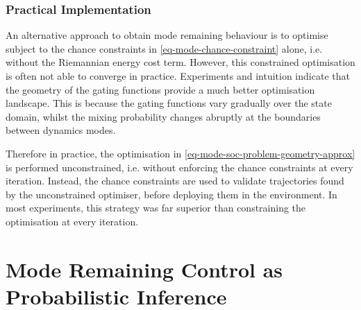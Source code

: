 \documentclass{mimosis-class/mimosis}
\numberwithin{equation}{chapter}
\newcommand{\modeInd}{\ensuremath{k}}
\newcommand{\state}{\ensuremath{\mathbf{x}}}
\newcommand{\control}{\ensuremath{\mathbf{u}}}
\newcommand{\modeVar}{\ensuremath{\alpha}}
\begin{document}
{\subsubsection{Practical Implementation}
\label{sec:org62d33fa}
An alternative approach to obtain mode remaining behaviour is to optimise subject to the chance constraints
in \cref{eq-mode-chance-constraint} alone, i.e. without the Riemannian energy cost term.
However, this constrained optimisation is often not able to converge in practice.
Experiments and intuition indicate that the geometry of the gating functions provide a much
better optimisation landscape.
This is because the gating functions vary gradually over the state domain, whilst the mixing probability changes
abruptly at the boundaries between dynamics modes.

Therefore in practice, the optimisation in \cref{eq-mode-soc-problem-geometry-approx}
is performed unconstrained, i.e. without enforcing the chance constraints at every iteration.
Instead, the chance constraints are used to validate trajectories found by the unconstrained
optimiser, before deploying them in the environment.
In most experiments, this strategy was far superior than constraining the optimisation at every iteration.

\section{Mode Remaining Control as Probabilistic Inference \label{chap-traj-opt-inference}}
\label{sec:orgd81abc5}
\newcommand{\startStateDist}{\ensuremath{p(\state_{1})}}
\newcommand{\transitionDist}{\ensuremath{p(\state_{\timeInd+1} \mid \state_\timeInd, \control_\timeInd, \modeVar_{\timeInd}=\desiredMode)}}
\renewcommand{\controlDist}{\ensuremath{\policy(\control_\timeInd \mid \state_\timeInd)}}


\renewcommand{\trajectoryVarDist}{\ensuremath{q(\stateTraj, \controlTraj \mid \state_0, \modeVarTraj)}}
\newcommand{\controlTrajVarDist}{\ensuremath{q(\control_{0:\TimeInd} \mid \state_{0:\TimeInd})}}
\newcommand{\controlVarDist}{\ensuremath{q(\control_{\timeInd})}}

\newcommand{\optimalVar}{\ensuremath{\mathcal{O}}}
\newcommand{\monotonicFunc}{\ensuremath{g}}
\newcommand{\temperature}{\ensuremath{\gamma}}

\newcommand{\optimalVarTraj}{\ensuremath{\bar{\bm{\optimalVar}}}}

\newcommand{\modeProb}{\ensuremath{\Pr(\modeVar_\timeInd = \modeInd \mid \state_\timeInd, \control_\timeInd)}}
\renewcommand{\optimalProb}{\ensuremath{\Pr(\optimalVar_\timeInd = 1 \mid \state_\timeInd, \control_\timeInd)}}
\newcommand{\optimalDist}{\ensuremath{P(\optimalVar_\timeInd \mid \state_\timeInd, \control_\timeInd)}}

}
\end{document}
